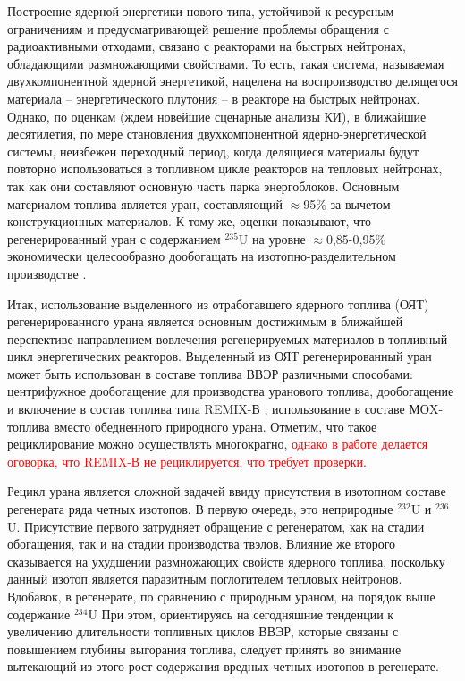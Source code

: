 
{\actuality}

Построение ядерной энергетики нового типа, устойчивой к ресурсным ограничениям и предусматривающей решение проблемы обращения с радиоактивными отходами, связано с реакторами на быстрых нейтронах, обладающими размножающими свойствами. То есть, такая система, называемая двухкомпонентной ядерной энергетикой, нацелена на воспроизводство делящегося материала -- энергетического  плутония -- в реакторе на быстрых нейтронах. Однако, по оценкам (ждем новейшие сценарные анализы КИ), в ближайшие десятилетия, по мере становления двухкомпонентной ядерно-энергетической системы, неизбежен переходный период, когда делящиеся материалы будут повторно использоваться в топливном цикле реакторов на тепловых нейтронах, так как они составляют основную часть парка энергоблоков. Основным материалом топлива является уран, составляющий $\approx$95\% за вычетом конструкционных материалов. К тому же, оценки показывают, что регенерированный уран с содержанием $^{235}$U на уровне $\approx$0,85-0,95\% экономически целесообразно дообогащать на изотопно-разделительном производстве \cite{NikipelovNikipelovSudby}.

Итак, использование выделенного из отработавшего ядерного топлива (ОЯТ) регенерированного урана является основным достижимым в ближайшей перспективе направлением вовлечения регенерируемых материалов в топливный цикл энергетических реакторов. Выделенный из ОЯТ регенерированный уран может быть использован в составе топлива ВВЭР различными способами: центрифужное дообогащение для производства уранового топлива, дообогащение и включение в состав топлива типа REMIX-В \cite{zilbermanVozmozhnostIspolzovaniyaTopliva2012}, использование в составе МОX-топлива вместо обедненного природного урана. Отметим, что такое рециклирование можно осуществлять многократно, \textcolor{red}{однако в работе \cite{postovarovaRadiacionnyeHarakteristikiRemikstopliva} делается оговорка, что REMIX-В не рециклируется, что требует проверки}.

Рецикл урана является сложной задачей ввиду присутствия в изотопном составе регенерата ряда четных изотопов. В первую очередь, это неприродные $^{232}$U и $^{236}$U. Присутствие первого затрудняет обращение с регенератом, как на стадии обогащения, так и на стадии производства твэлов. Влияние же второго сказывается на ухудшении размножающих свойств ядерного топлива, поскольку данный изотоп является паразитным поглотителем тепловых нейтронов. Вдобавок, в регенерате, по сравнению с природным ураном, на порядок выше содержание $^{234}$U При этом, ориентируясь на сегодняшние тенденции к увеличению длительности топливных циклов ВВЭР, которые связаны с повышением глубины выгорания топлива, следует принять во внимание вытекающий из этого рост содержания вредных четных изотопов в регенерате.

